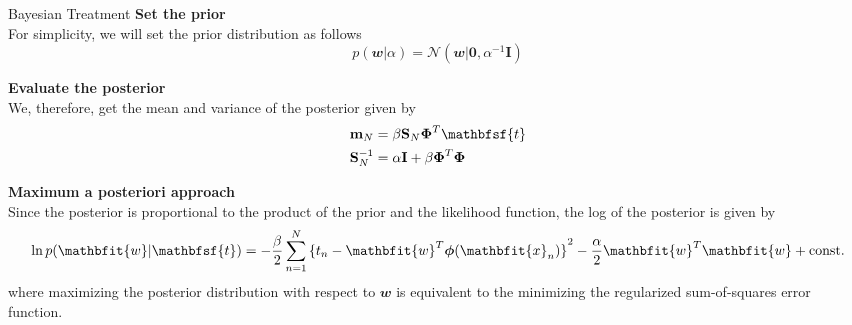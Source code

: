 \documentclass{bredelebeamer}
\begin{document}
\begin{frame}{Bayesian Treatment}
  \textbf{Set the prior}\\
  For simplicity, we will set the prior distribution as follows
  \begin{equation}
    p(\mathbfit{w}|\alpha) = \mathcal{N}(\mathbfit{w}|\mathbf{0}, \alpha^{-1}\mathbf{I})
  \end{equation}

  \textbf{Evaluate the posterior}\\
  We, therefore, get the mean and variance of the posterior given by
  \begin{equation}
    \begin{split}
      \mathbf{m}_N
      &= \beta \mathbf{S}_N \boldsymbol{\Phi}^T \mathbfsf{t}\\
      \mathbf{S}_{N}^{-1}
      &= \alpha \mathbf{I} + \beta \boldsymbol{\Phi}^T \boldsymbol{\Phi}
    \end{split}
  \end{equation}

  \textbf{Maximum a posteriori approach} \\
  Since the posterior is proportional to the product of the prior and the
  likelihood function, the log of the posterior is given by
  \begin{equation}
    \ln p(\mathbfit{w}|\mathbfsf{t})
    = -\frac{\beta}{2} \sum_{n=1}^{N} {\{t_n - \mathbfit{w}^T \boldsymbol{\phi} (\mathbfit{x}_n)\}}^2
      -\frac{\alpha}{2} \mathbfit{w}^T \mathbfit{w} + \textrm{const.}
  \end{equation}
  where maximizing the posterior distribution with respect to $\mathbfit{w}$ is
  equivalent to the minimizing the regularized sum-of-squares error function.
\end{frame}
\end{document}

